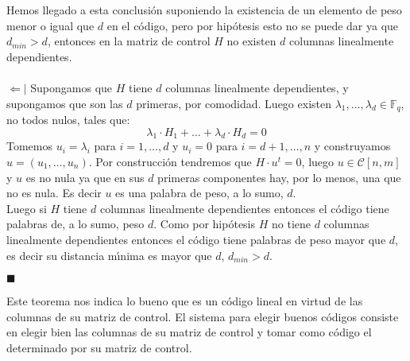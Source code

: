Hemos llegado a esta conclusi\'on suponiendo la existencia de un elemento de
peso menor o igual que $d$ en el c\'odigo, pero por hip\'otesis esto no se puede
dar ya que $d_{min}>d$, entonces en la matriz de control $H$ no existen $d$ 
columnas linealmente dependientes.\\ \\
%
$\Leftarrow |$ Supongamos que $H$ tiene $d$ columnas linealmente dependientes, y
supongamos que son las $d$ primeras, por comodidad. Luego existen
$\lambda_1,\dots,\lambda_d \in \mathbb{F}_q$, no todos nulos, tales que:
\begin{displaymath}
\lambda_1 \cdot H_1+\dots+\lambda_d \cdot H_d = 0
\end{displaymath}
%
\newpage
%
Tomemos $u_i = \lambda_i$ para $i=1,\dots,d$ y $u_i=0$ para $i=d+1,\dots,n$ y
construyamos $u=(u_1,\dots,u_n)$. Por construcci\'on tendremos que
$H\cdot u^t=0$, luego $u\in \mathcal{C}[n,m]$ y $u$ es no nula ya que en sus
$d$ primeras componentes hay, por lo menos, una que no es nula. Es decir $u$
es una palabra de peso, a lo sumo, $d$.\\

Luego si $H$ tiene $d$ columnas linealmente dependientes entonces el c\'odigo
tiene palabras de, a lo sumo, peso $d$. Como por hip\'otesis $H$ no tiene
$d$ columnas linealmente dependientes entonces el c\'odigo tiene palabras de
peso mayor que $d$, es decir su distancia m\'{\i}nima es mayor que $d$,
$d_{min}>d$.
\begin{flushright}
$\blacksquare$
\end{flushright}
Este teorema nos indica lo bueno que es un c\'odigo lineal en virtud de las
columnas de su matriz de control. El sistema para elegir buenos c\'odigos
consiste en elegir bien las columnas de su matriz de control y tomar como
c\'odigo el determinado por su matriz de control.
